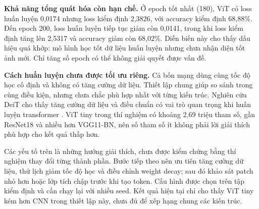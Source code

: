 \textbf{Khả năng tổng quát hóa còn hạn chế.} Ở epoch tốt nhất (180), ViT
có loss huấn luyện 0,0174 nhưng loss kiểm định 2,3826, với accuracy
kiểm định 68,88\%. Đến epoch 200, loss huấn luyện tiếp tục giảm còn 0,0141,
trong khi loss kiểm định tăng lên 2,5317 và accuracy giảm còn 68,02\%.
Diễn biến này cho thấy dấu hiệu quá khớp: mô hình học tốt dữ liệu huấn luyện
nhưng chưa nhận diện tốt ảnh mới. Chỉ tăng số epoch có thể không giải quyết
được vấn đề.

\textbf{Cách huấn luyện chưa được tối ưu riêng.} Cả bốn mạng dùng cùng
tốc độ học cố định và không có tăng cường dữ liệu. Thiết lập chung giúp so
sánh trong cùng điều kiện, nhưng chưa chắc phù hợp nhất với từng kiến trúc.
Nghiên cứu DeiT cho thấy tăng cường dữ liệu và điều chuẩn có vai trò quan
trọng khi huấn luyện transformer \cite{touvron2021deit}. ViT tiny trong
thí nghiệm có khoảng 2,69 triệu tham số, gần ResNet18 và nhiều hơn VGG11-BN,
nên số tham số ít không phải lời giải thích phù hợp cho kết quả thấp hơn.

Các yếu tố trên là những hướng giải thích, chưa được kiểm chứng bằng
thí nghiệm thay đổi từng thành phần. Bước tiếp theo nên ưu tiên tăng cường
dữ liệu, thử lịch giảm tốc độ học và điều chỉnh weight decay; sau đó khảo
sát patch nhỏ hơn hoặc lớp tích chập trước khi tạo token. Cấu hình được
chọn trên tập kiểm định và cần chạy lại với nhiều seed. Kết quả hiện tại
chỉ cho thấy ViT tiny kém hơn CNN trong thiết lập này, chưa đủ để xếp hạng
chung các kiến trúc.
